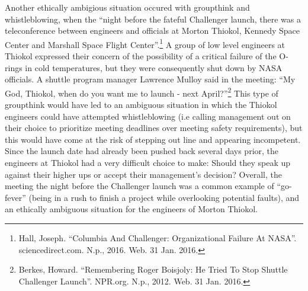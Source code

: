 \documentclass{article}
\newcommand{\q}[1]{``#1''}
\begin{document}
Another ethically ambigious situation occured with groupthink and whistleblowing, when the \q{night before the fateful Challenger launch, there was a teleconference between engineers and officials at Morton Thiokol, Kennedy Space Center and Marshall Space Flight Center}.\footnote{Hall, Joseph. \q{Columbia And Challenger: Organizational Failure At NASA}. sciencedirect.com. N.p., 2016. Web. 31 Jan. 2016.} A group of low level engineers at Thiokol expressed their concern of the possibility of a critical failure of the O-rings in cold temperatures, but they were consequently shut down by NASA officials. A shuttle program manager Lawrence Mulloy said in the meeting: \q{My God, Thiokol, when do you want me to launch - next April?}\footnote{Berkes, Howard. \q{Remembering Roger Boisjoly:  He Tried To Stop Shuttle Challenger Launch}. NPR.org. N.p., 2012. Web. 31 Jan. 2016.} This type of groupthink would have led to an ambiguous situation in which the Thiokol engineers could have attempted whistleblowing (i.e calling management out on their choice to prioritize meeting deadlines over meeting safety requirements), but this would have come at the risk of stepping out line and appearing incompetent. Since the launch date had already been pushed back several days prior, the engineers at Thiokol had a very difficult choice to make: Should they speak up against their higher ups or accept their management's decision? Overall, the meeting the night before the Challenger launch was a common example of \q{go-fever} (being in a rush to finish a project while overlooking potential faults), and an ethically ambiguous situation for the engineers of Morton Thiokol.
\par
\end{document}
